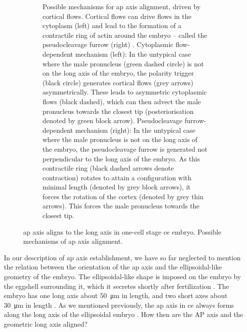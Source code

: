 \begin{figure}
\begin{subfigure}{\textwidth}
    \caption{Possible mechanisms for \acs{ap} axis alignment, driven by cortical flows. Cortical flows can drive flows in the cytoplasm (left) \citep{niwayama2011hydrodynamic} and lead to the formation of a contractile ring of actin around the embryo -- called the pseudocleavage furrow (right) \citep{reymann2016cortical}. Cytoplasmic flow-dependent mechanism (left): In the untypical case where the male pronucleus (green dashed circle) is not on the long axis of the embryo, the polarity trigger (black circle) generates cortical flows (grey arrows) asymmetrically. These leads to asymmetric cytoplasmic flows (black dashed), which can then advect the male pronucleus towards the closest tip (posteriorisation denoted by green block arrow). Pseudocleavage furrow-dependent mechanism (right): In the untypical case where the male pronucleus is not on the long axis of the embryo, the pseudocleavage furrow is generated not perpendicular to the long axis of the embryo. As this contractile ring (black dashed arrows denote contraction) rotates to attain a configuration with minimal length (denoted by grey block arrows), it forces the rotation of the cortex (denoted by grey thin arrows). This forces the male pronucleus towards the closest tip.}
    \label{subfig:apAxisAlignment-mechanisms}
\end{subfigure}

\caption[\acs{ap} axis alignment in \acs{ce}]{\acs{ap} axis aligns to the long axis in one-cell stage \acs{ce} embryo. Possible mechanisms of \acs{ap} axis alignment.}
\label{fig:apAxisAlignment}

\end{figure}

In our description of \ac{ap} axis establishment, we have so far neglected to mention the relation between the orientation of the \ac{ap} axis and the ellipsoidal-like geometry of the embryo. The ellipsoidal-like shape is imposed on the embryo by the eggshell surrounding it, which it secretes shortly after fertilization \citep{johnston2012eggshell}. The embryo has one long axis about \SI{50}{\micro\meter} in length, and two short axes about \SI{30}{\micro\meter} in length \citep{begasse2011,riddle1997celegans}. As we mentioned previously, the \ac{ap} axis in \ac{ce} always forms along the long axis of the ellipsoidal embryo \citep{goldstein1996specification}. How then are the AP axis and the geometric long axis aligned?

